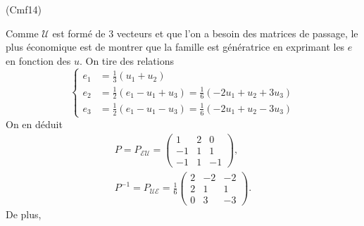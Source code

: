 \begin{tiny}(Cmf14)\end{tiny} Comme $\mathcal{U}$ est formé de 3 vecteurs et que l'on a besoin des matrices de passage, le plus économique est de montrer que la famille est génératrice en exprimant les $e$ en fonction des $u$. On tire des relations
\[
\left\lbrace
  \begin{aligned}
    e_1 &= \frac{1}{3}\left(u_1 + u_2\right)\\
    e_2 &= \frac{1}{2}\left(e_1 -u_1 + u_3\right) = \frac{1}{6}\left(-2u_1 + u_2 + 3u_3\right)\\
    e_3 &= \frac{1}{2}\left(e_1 -u_1 - u_3\right) =\frac{1}{6}\left(-2u_1 + u_2 - 3u_3\right)
  \end{aligned}
\right.
\]
On en déduit
\begin{multline*}
  P = P_{\mathcal{E}\mathcal{U}}=
  \begin{pmatrix}
    1 & 2 & 0 \\ -1 & 1 & 1 \\ -1 & 1 & -1
  \end{pmatrix},\\
P^{-1} = P_{\mathcal{U}\mathcal{E}}= \frac{1}{6}
  \begin{pmatrix}
    2 & -2 & -2 \\ 2 & 1 & 1 \\ 0 & 3 & -3
  \end{pmatrix}.
\end{multline*}
De plus,
